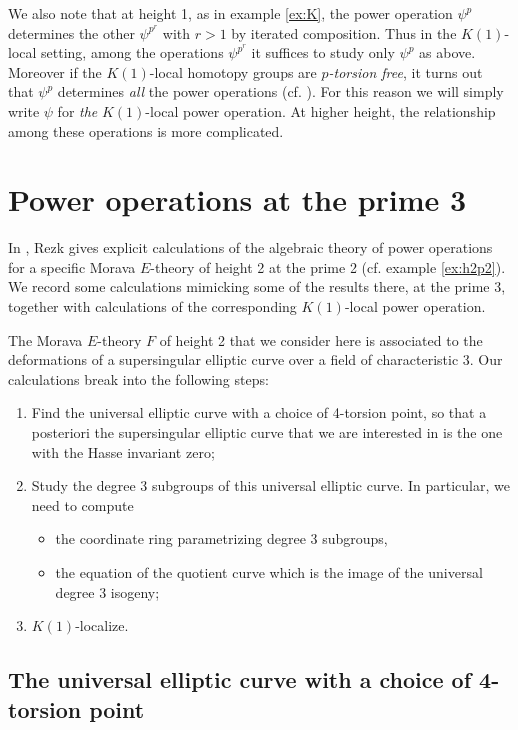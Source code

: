 \documentclass{gtpart}
\theoremstyle{definition}
\theoremstyle{remark}
\begin{document}
We also note that at height 1, as in example \ref{ex:K}, the power 
operation $\psi^p$ determines the other $\psi^{p^r}$ with 
$r > 1$ by iterated composition.  Thus in the $K(1)$-local setting, among the operations $\psi^{p^r}$ it suffices to study only $\psi^p$ as above.  
Moreover if the $K(1)$-local homotopy groups are {\em $p$-torsion free}, it turns out that $\psi^p$ determines {\em all} the power operations (cf. \cite[section 3]{lpo}).  For this reason 
we will simply write $\psi$ for {\em the} $K(1)$-local power operation.  
At higher height, the relationship among these operations is more 
complicated.  


\section{Power operations at the prime 3}
\label{sec:p3}


In \cite{h2p2}, Rezk gives explicit calculations of the algebraic theory 
of power operations for a specific Morava $E$-theory of height 2 at the 
prime 2 (cf. example \ref{ex:h2p2}).  We record some calculations 
mimicking some of the results there, at the prime 3, together with 
calculations of the corresponding $K(1)$-local power operation.  

The Morava $E$-theory $F$ of height 2 that we consider here is associated to 
the deformations of a supersingular elliptic curve over a field of characteristic 3.  Our 
calculations break into the following steps:
\begin{enumerate}
 \item Find the universal elliptic curve with a choice of 4-torsion 
 point, so that a posteriori the supersingular elliptic curve that we are 
 interested in is the one with the Hasse invariant zero; 
 \item Study the degree 3 subgroups of this universal elliptic curve.  In 
 particular, we need to compute 
\begin{itemize}
 \item the coordinate ring parametrizing degree 3 subgroups,  
 \item the equation of the quotient curve which is the image of the 
 universal degree 3 isogeny;
\end{itemize} 
 \item $K(1)$-localize.  
\end{enumerate}


\subsection{The universal elliptic curve with a choice of 4-torsion point}
\label{subsec:step1}
\end{document}
